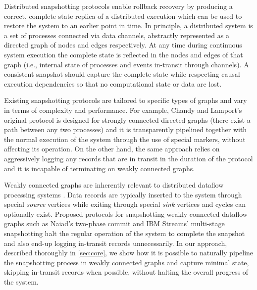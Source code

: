 Distributed snapshotting \cite{chandy1985distributed} protocols enable rollback recovery by producing a correct, complete state replica of a distributed execution which can be used to restore the system to an earlier point in time. In principle, a distributed system is a set of processes connected via data channels, abstractly represented as a directed graph of nodes and edges respectively. At any time during continuous system execution the complete state is reflected in the nodes and edges of that graph (i.e., internal state of processes and events in-transit through channels). A consistent snapshot should capture the complete state while respecting causal execution dependencies so that no computational state or data are lost. 

Existing snapshotting protocols are tailored to specific types of graphs and vary in terms of complexity and performance. For example, Chandy and Lamport's original protocol \cite{chandy1985distributed} is designed for strongly connected directed graphs (there exist a path between any two processes) and it is transparently pipelined together with the normal execution of the system through the use of special markers, without affecting its operation. On the other hand, the same approach relies on aggressively logging any records that are in transit in the duration of the protocol and it is incapable of terminating on weakly connected graphs. 

Weakly connected graphs are inherently relevant to distributed dataflow processing systems \cite{murray2013naiad,jacques2016consistent,millwheel,chambers2010flumejava,castro2013integrating}. Data records are typically inserted to the system through special \emph{source} vertices while exiting through special \emph{sink} vertices and cycles can optionally exist. Proposed protocols for snapshotting weakly connected dataflow graphs such as Naiad's two-phase commit \cite{murray2013naiad} and IBM Streams' multi-stage snapshotting halt the regular operation of the system to complete the snapshot and also end-up logging in-transit records unnecessarily. In our approach, described thoroughly in \autoref{sec:core}, we show how it is possible to naturally pipeline the snapshotting process in weakly connected graphs and capture minimal state, skipping in-transit records when possible, without halting the overall progress of the system.

